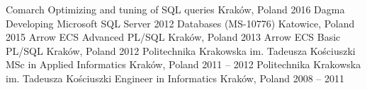 

\begin{cventries}

	\cventry
		{Comarch}
		{Optimizing and tuning of SQL queries}
		{Kraków, Poland}
		{2016}
		{}
  \cventry
  	{Dagma}
  	{Developing Microsoft SQL Server 2012 Databases (MS-10776)}
  	{Katowice, Poland}
  	{2015}
  	{}
  \cventry
  	{Arrow ECS}
  	{Advanced PL/SQL}
  	{Kraków, Poland}
  	{2013}
  	{}
  \cventry
    	{Arrow ECS}
    	{Basic PL/SQL}
    	{Kraków, Poland}
    	{2012}
    	{}
  \cventry
  	{Politechnika Krakowska im. Tadeusza Kościuszki}
    {MSc in Applied Informatics} %
    {Kraków, Poland} %
    {2011 -- 2012} %
    {}
  \cventry
    {Politechnika Krakowska im. Tadeusza Kościuszki} %
    {Engineer in Informatics} %
    {Kraków, Poland} %
    {2008 -- 2011} %
    {}

\end{cventries}

